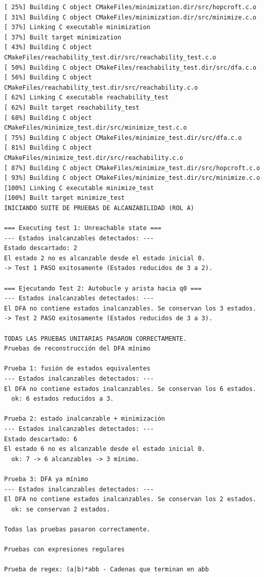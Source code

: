\documentclass[12pt, letterpaper]{article}
\begin{document}
\begin{lstlisting}[style=bashstyle]
[ 25%] Building C object CMakeFiles/minimization.dir/src/hopcroft.c.o
[ 31%] Building C object CMakeFiles/minimization.dir/src/minimize.c.o
[ 37%] Linking C executable minimization
[ 37%] Built target minimization
[ 43%] Building C object CMakeFiles/reachability_test.dir/src/reachability_test.c.o
[ 50%] Building C object CMakeFiles/reachability_test.dir/src/dfa.c.o
[ 56%] Building C object CMakeFiles/reachability_test.dir/src/reachability.c.o
[ 62%] Linking C executable reachability_test
[ 62%] Built target reachability_test
[ 68%] Building C object CMakeFiles/minimize_test.dir/src/minimize_test.c.o
[ 75%] Building C object CMakeFiles/minimize_test.dir/src/dfa.c.o
[ 81%] Building C object CMakeFiles/minimize_test.dir/src/reachability.c.o
[ 87%] Building C object CMakeFiles/minimize_test.dir/src/hopcroft.c.o
[ 93%] Building C object CMakeFiles/minimize_test.dir/src/minimize.c.o
[100%] Linking C executable minimize_test
[100%] Built target minimize_test
INICIANDO SUITE DE PRUEBAS DE ALCANZABILIDAD (ROL A)

=== Executing test 1: Unreachable state ===
--- Estados inalcanzables detectados: ---
Estado descartado: 2
El estado 2 no es alcanzable desde el estado inicial 0.
-> Test 1 PASO exitosamente (Estados reducidos de 3 a 2).

=== Ejecutando Test 2: Autobucle y arista hacia q0 ===
--- Estados inalcanzables detectados: ---
El DFA no contiene estados inalcanzables. Se conservan los 3 estados.
-> Test 2 PASO exitosamente (Estados reducidos de 3 a 3).

TODAS LAS PRUEBAS UNITARIAS PASARON CORRECTAMENTE.
Pruebas de reconstrucción del DFA mínimo

Prueba 1: fusión de estados equivalentes
--- Estados inalcanzables detectados: ---
El DFA no contiene estados inalcanzables. Se conservan los 6 estados.
  ok: 6 estados reducidos a 3.

Prueba 2: estado inalcanzable + minimización
--- Estados inalcanzables detectados: ---
Estado descartado: 6
El estado 6 no es alcanzable desde el estado inicial 0.
  ok: 7 -> 6 alcanzables -> 3 mínimo.

Prueba 3: DFA ya mínimo
--- Estados inalcanzables detectados: ---
El DFA no contiene estados inalcanzables. Se conservan los 2 estados.
  ok: se conservan 2 estados.

Todas las pruebas pasaron correctamente.

Pruebas con expresiones regulares

Prueba de regex: (a|b)*abb - Cadenas que terminan en abb


\end{lstlisting}
\end{document}
